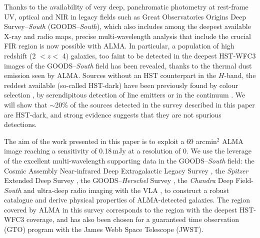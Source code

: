 \documentclass[longauth]{aa}
\begin{document}
Thanks to the availability of very deep, panchromatic photometry at rest-frame UV, optical and NIR in legacy fields such as Great Observatories Origins Deep Survey--\textit{South} (GOODS--\textit{South}), which also includes among the deepest available X-ray and radio maps, precise multi-wavelength analysis that include the crucial FIR region is now possible with ALMA. In particular, a population of high redshift (2 $<z<$ 4) galaxies, too faint to be detected in the deepest HST-WFC3 images of the GOODS--\textit{South} field has been revealed, thanks to the thermal dust emission seen by ALMA. Sources without an HST counterpart in the $H$-band, the reddest available (so-called HST-dark) have been previously found by colour selection \cite[e.g.][]{Huang2012, Caputi2012, Caputi2015, Wang2016}, by serendipitous detection of line emitters \cite[e.g.][]{Ono2014} or in the continuum \cite[e.g.][]{Fujimoto2016}. We will show that $\sim$20\% of the sources detected in the survey described in this paper are HST-dark, and strong evidence suggests that they are not spurious detections.

The aim of the work presented in this paper is to exploit a 69 arcmin$^2$ ALMA image reaching a sensitivity of 0.18\,mJy at a resolution of 0.  We use the leverage of the excellent multi-wavelength supporting data in the GOODS--\textit{South} field: the Cosmic Assembly Near-infrared Deep Extragalactic Legacy Survey \mbox{\citep{Koekemoer2011,Grogin2011}}, the \textit{Spitzer} Extended Deep Survey \citep{Ashby2013}, the GOODS--\textit{Herschel} Survey \citep{Elbaz2011}, the \textit{Chandra} Deep Field-\textit{South} \citep{Luo2017} and ultra-deep radio imaging with the VLA \citep{Rujopakarn2016}, to construct a robust catalogue and derive physical properties of ALMA-detected galaxies. 
The region covered by ALMA in this survey corresponds to the region with the deepest HST-WFC3 coverage, and has also been chosen for a guaranteed time observation (GTO) program with the James Webb Space Telescope (JWST).
\end{document}
